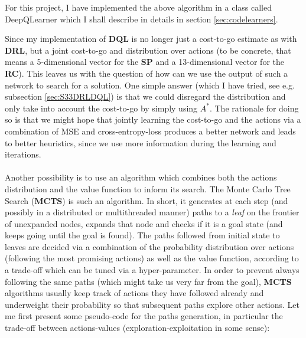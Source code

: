 For this project, I have implemented the above algorithm in a class called DeepQLearner which I shall describe in details in section \ref{sec:codelearners}.


\label{sec:TheoryMCTS}

Since my implementation of \textbf{DQL} is no longer just a cost-to-go estimate as with \textbf{DRL}, but a joint cost-to-go and distribution over actions (to be concrete, that means a 5-dimensional vector for the \textbf{SP} and a 13-dimensional vector for the \textbf{RC}). This leaves us with the question of how can we use the output of such a network to search for a solution. One simple answer (which I have tried, see e.g. subsection \ref{sec:S33DRLDQL}) is that we could disregard the distribution and only take into account the cost-to-go by simply using $A^{*}$. The rationale for doing so is that we might hope that jointly learning the cost-to-go and the actions via a combination of MSE and cross-entropy-loss produces a better network and leads to better heuristics, since we use more information during the learning and iterations.
\\
\\
Another possibility is to use an algorithm which combines both the actions distribution and the value function to inform its search. The Monte Carlo Tree Search (\textbf{MCTS}) is such an algorithm. In short, it generates at each step (and possibly in a distributed or multithreaded manner) paths to a \textit{leaf} on the frontier of unexpanded nodes, expands that node and checks if it is a goal state (and keeps going until the goal is found). The paths followed from initial state to leaves are decided via a combination of the probability distribution over actions (following the most promising actions) as well as the value function, according to a trade-off which can be tuned via a hyper-parameter. In order to prevent always following the same paths (which might take us very far from the goal), \textbf{MCTS} algorithms usually keep track of actions they have followed already and underweight their probability so that subsequent paths explore other actions. Let me first present some pseudo-code for the paths generation, in particular the trade-off between actions-values (exploration-exploitation in some sense):
\\


